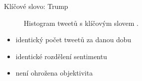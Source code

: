 \documentclass[notheorems,12pt]{beamer}
\begin{document}
\begin{frame}{Klíčové slovo: Trump}
    \begin{figure}
        \centering
        \vspace{-0.7cm}
        \caption*{Histogram tweetů s klíčovým slovem \textit{}.}
    \end{figure}
	\begin{itemize}
		\item identický počet tweetů za danou dobu
        \item identické rozdělení sentimentu
        \item není ohrožena objektivita
	\end{itemize}
\end{frame}
\end{document}
